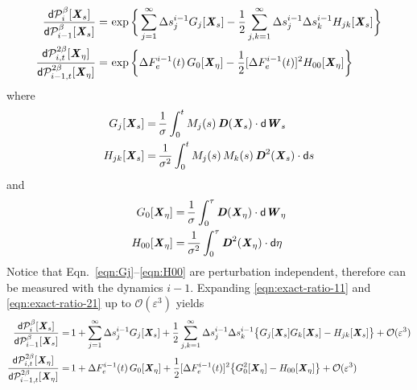 \documentclass[aip,jcp,a4paper,reprint,onecolumn]{revtex4-1}
\newcommand{\vect}[1]{\textbf{\textit{#1}}}
\newcommand{\dd}{\textsf{d}}
\begin{document}
\begin{align}\label{eqn:exact-ratio-11}
  \frac
  {\dd\mathcal P_{i}^\beta[\vect X_s]}
  {\dd\mathcal P_{i-1}^\beta[\vect X_s]}  
  =&\,
  \exp
  \bigg\{
  \sum_{j=1}^\infty
  \Delta s_j^{i-1}G_j[\vect X_s]
  -
  \frac12 \sum_{j,k=1}^\infty
  \Delta s_j^{i-1} \Delta s_k^{i-1}H_{jk}[\vect X_s]
  \bigg\}\\\label{eqn:exact-ratio-21}
  \frac
  {\dd\mathcal P_{i,t}^{2\beta}[\vect X_\eta]}
  {\dd\mathcal P_{i-1,t}^{2\beta}[\vect X_\eta]}
  =&\,
  \exp
  \bigg\{
  \Delta F_e^{i-1}(t)\,
  G_0[\vect X_\eta]
  -
  \frac12[\Delta F_e^{i-1}(t)]^2
  H_{00}[\vect X_\eta]
  \bigg\}
\end{align}
where
\begin{align}\label{eqn:Gj}
  G_j[\vect X_s]
  =&\,
  \frac 1\sigma
  \int_0^t
  M_j(s)\,\vect D(\vect X_s)\cdot\dd\vect W_s\\\label{eqn:Hjk}
  H_{jk}[\vect X_s]
  =&\,
  \frac 1{\sigma^2}
  \int_0^t
  M_j(s)\,M_k(s)\,\vect D^2(\vect X_s)\cdot\dd s
\end{align}
and 
\begin{align}\label{eqn:G0}
  G_0[\vect X_\eta]
  =&\,
  \frac 1\sigma
  \int_0^\tau
  \vect D(\vect X_\eta)\cdot\dd\vect W_\eta\\\label{eqn:H00}
  H_{00}[\vect X_\eta]
  =&\,
  \frac 1{\sigma^2}
  \int_0^\tau
  \vect D^2(\vect X_\eta)\cdot\dd \eta
\end{align}
Notice that Eqn.~\eqref{eqn:Gj}--\eqref{eqn:H00} are perturbation
independent, therefore can be measured with the dynamics $i-1$.
Expanding \eqref{eqn:exact-ratio-11} and \eqref{eqn:exact-ratio-21}
up to $\mathcal O(\varepsilon^3)$ yields
\begin{align}\label{eqn:expan-ratio-1}
  \frac
  {\dd\mathcal P_{i}^\beta[\vect X_s]}
  {\dd\mathcal P_{i-1}^\beta[\vect X_s]}
  =&\,
  1
  +
  \sum_{j=1}^\infty
  \Delta s_j^{i-1}G_j[\vect X_s]
  +
  \frac12  
  \sum_{j,k=1}^\infty
  \Delta s_j^{i-1}\Delta s_k^{i-1}
  \big\{
  G_j[\vect X_s]G_k[\vect X_s] - H_{jk}[\vect X_s]
  \big\}
  +
  \mathcal O(\varepsilon^3)
  \\\label{eqn:expan-ratio-2}
  \frac
  {\dd\mathcal P_{i,t}^{2\beta}[\vect X_\eta]}
  {\dd\mathcal P_{i-1,t}^{2\beta}[\vect X_\eta]}
  =&\,
  1 +
  \Delta F_e^{i-1}(t)\,
  G_0[\vect X_\eta]
  +
  \frac12[\Delta F_e^{i-1}(t)]^2
  \big\{
  G^2_0[\vect X_\eta] - H_{00}[\vect X_\eta]
  \big\}
  +
  \mathcal O(\varepsilon^3)
\end{align}
\end{document}
